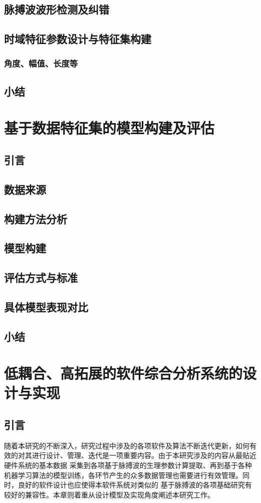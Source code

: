 \section{脉搏波波形检测及纠错}
\section{时域特征参数设计与特征集构建}
\subsection{角度、幅值、长度等}
\section{小结}

\chapter{基于数据特征集的模型构建及评估}
\section{引言}

\section{数据来源}
\section{构建方法分析}
\section{模型构建}
\section{评估方式与标准}
\section{具体模型表现对比}
\section{小结}

\chapter{低耦合、高拓展的软件综合分析系统的设计与实现}
\section{引言}
随着本研究的不断深入，研究过程中涉及的各项软件及算法不断迭代更新，如何有效的对其进行设计、管理、迭代是一项重要内容。由于本研究涉及的内容从最贴近硬件系统的基本数据
采集到各项基于脉搏波的生理参数计算提取、再到基于各种机器学习算法的模型训练，各环节产生的众多数据管理也需要进行有效管理。同时，良好的软件设计也应使得本软件系统对类似的
基于脉搏波的各项基础研究有较好的兼容性。本章则着重从设计模型及实现角度阐述本研究工作。
